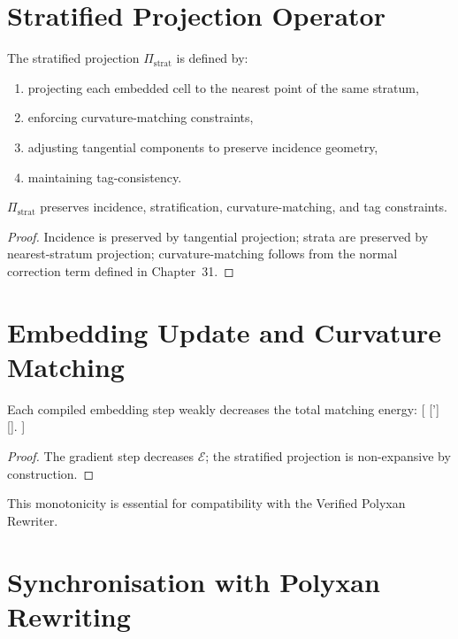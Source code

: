 \section{Stratified Projection Operator}

The stratified projection $\Pi_{\mathrm{strat}}$ is defined by:
\begin{enumerate}
\item projecting each embedded cell to the nearest point of the same stratum,
\item enforcing curvature-matching constraints,
\item adjusting tangential components to preserve incidence geometry,
\item maintaining tag-consistency.
\end{enumerate}

\begin{lemma}
$\Pi_{\mathrm{strat}}$ preserves incidence, stratification, curvature-matching, and tag constraints.
\end{lemma}

\begin{proof}
Incidence is preserved by tangential projection;
strata are preserved by nearest-stratum projection;
curvature-matching follows from the normal correction term defined in Chapter~31.
\end{proof}

\section{Embedding Update and Curvature Matching}

\begin{theorem}
Each compiled embedding step weakly decreases the total matching energy:
[
[\iota'] \leq {}[\iota].
]
\end{theorem}

\begin{proof}
The gradient step decreases $\mathcal{E}$;
the stratified projection is non-expansive by construction.
\end{proof}

This monotonicity is essential for compatibility with the Verified Polyxan Rewriter.

\section{Synchronisation with Polyxan Rewriting}

